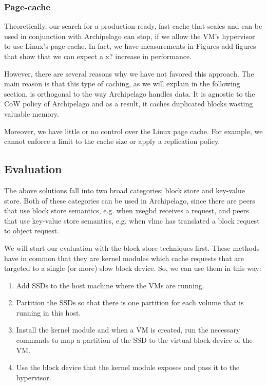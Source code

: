 \subsubsection{Page-cache}

Theoretically, our search for a production-ready, fast cache that scales and 
can be used in conjunction with Archipelago can stop, if we allow the VM's 
hypervisor to use Linux's page cache. In fact, we have measurements in Figures 
\fixme add figures that show that we can expect a x? increase in 
performance.

However, there are several reasons why we have not favored this approach. The 
main reason is that this type of caching, as we will explain in the following 
section, is orthogonal to the way Archipelago handles data. It is agnostic to 
the CoW policy of Archipelago and as a result, it caches duplicated blocks 
wasting valuable memory.

Moreover, we have little or no control over the Linux page cache. For example, 
we cannot enforce a limit to the cache size or apply a replication policy.

\subsection{Evaluation}

The above solutions fall into two broad categories; block store and key-value 
store. Both of these categories can be used in Archipelago, since there are 
peers that use block store semantics, e.g.  when xsegbd receives a request, and 
peers that use key-value store semantics, e.g.  when vlmc has translated a 
block request to object request.

We will start our evaluation with the block store techniques first. These 
methods have in common that they are kernel modules which cache requests that 
are targeted to a single (or more) slow block device. So, we can use them in 
this way:

\begin{enumerate}
	\item Add SSDs to the host machine where the VMs are running.
	\item Partition the SSDs so that there is one partition for each volume 
		that is running in this host.
	\item Install the kernel module and when a VM is created, run the necessary 
		commands to map a partition of the SSD to the virtual block device of 
		the VM.
	\item Use the block device that the kernel module exposes and pass it to 
		the hypervisor.
\end{enumerate}

